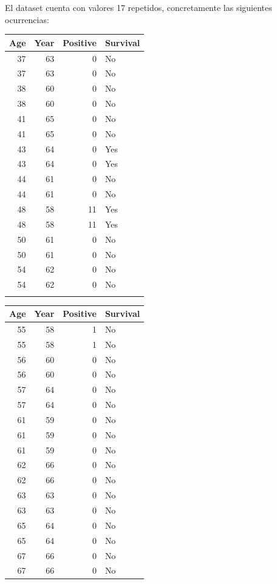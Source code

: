\newpage

El dataset cuenta con valores 17 repetidos, concretamente las siguientes ocurrencias:
\vspace{\baselineskip}

\begin{tabular}{r|r|r|l}
\hline
Age & Year & Positive & Survival\\
\hline
37 & 63 & 0 & No\\
\hline
37 & 63 & 0 & No\\
\hline
38 & 60 & 0 & No\\
\hline
38 & 60 & 0 & No\\
\hline
41 & 65 & 0 & No\\
\hline
41 & 65 & 0 & No\\
\hline
43 & 64 & 0 & Yes\\
\hline
43 & 64 & 0 & Yes\\
\hline
44 & 61 & 0 & No\\
\hline
44 & 61 & 0 & No\\
\hline
48 & 58 & 11 & Yes\\
\hline
48 & 58 & 11 & Yes\\
\hline
50 & 61 & 0 & No\\
\hline
50 & 61 & 0 & No\\
\hline
54 & 62 & 0 & No\\
\hline
54 & 62 & 0 & No\\
\hline
& & &\\
\hline
\end{tabular}
\begin{tabular}{r|r|r|l}
\hline
Age & Year & Positive & Survival\\
\hline
55 & 58 & 1 & No\\
\hline
55 & 58 & 1 & No\\
\hline
56 & 60 & 0 & No\\
\hline
56 & 60 & 0 & No\\
\hline
57 & 64 & 0 & No\\
\hline
57 & 64 & 0 & No\\
\hline
61 & 59 & 0 & No\\
\hline
61 & 59 & 0 & No\\
\hline
61 & 59 & 0 & No\\
\hline
62 & 66 & 0 & No\\
\hline
62 & 66 & 0 & No\\
\hline
63 & 63 & 0 & No\\
\hline
63 & 63 & 0 & No\\
\hline
65 & 64 & 0 & No\\
\hline
65 & 64 & 0 & No\\
\hline
67 & 66 & 0 & No\\
\hline
67 & 66 & 0 & No\\
\hline
\end{tabular}

